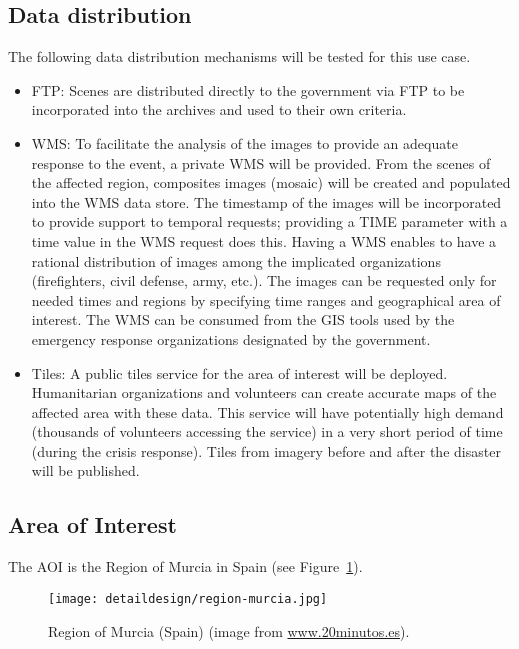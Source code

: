 \subsection{Data distribution}
The following data distribution mechanisms will be tested for this use case.
\begin{itemize}
\item \ac{FTP}: Scenes are distributed directly to the government via \ac{FTP} to be incorporated into the archives and used to their own criteria.
\item \ac{WMS}: To facilitate the analysis of the images to provide an adequate response to the event, a private \acl{WMS} will be provided. From the scenes of the affected region, composites images (mosaic) will be created and populated into the \ac{WMS} data store. The timestamp of the images will be incorporated to provide support to temporal requests; providing a TIME parameter with a time value in the WMS request does this. Having a WMS enables to have a rational distribution of images among the implicated organizations (firefighters, civil defense, army, etc.). The images can be requested only for needed times and regions by specifying time ranges and geographical area of interest. The WMS can be consumed from the GIS tools used by the emergency response organizations designated by the government.
\item Tiles: A public tiles service for the area of interest will be deployed. Humanitarian organizations and volunteers can create accurate maps of the affected area with these data. This service will have potentially high demand (thousands of volunteers accessing the service) in a very short period of time (during the crisis response). Tiles from imagery before and after the disaster will be published.
\end{itemize}

\subsection{Area of Interest} 
The \acl{AOI} is the Region of Murcia in Spain (see Figure~\ref{fig:region-murcia}). 

\begin{figure}[!h]
\begin{center}
\texttt{[image: detaildesign/region-murcia.jpg]}
\caption{Region of Murcia (Spain) (image from \url{www.20minutos.es}).}
\label{fig:region-murcia}
\end{center}
\end{figure}


